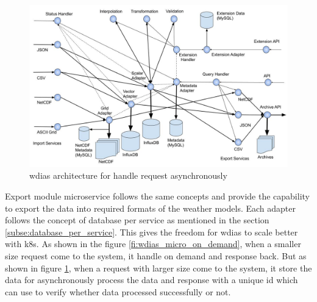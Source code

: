 \begin{figure}[htp]
    \centering
    \includegraphics[width=1\textwidth]{method/microservice/microservice_architecture-handle_on_async-v3.jpg}
    \caption{\acrshort{wdias} architecture for handle request asynchronously}
    \label{fi:wdias_micro_async}
\end{figure}
Export module microservice follows the same concepts and provide the capability to export the data into required formats of the weather models.
Each adapter follows the concept of database per service as mentioned in the section \ref{subse:database_per_service}. This gives the freedom for \acrshort{wdias} to scale better with \acrshort{k8s}.
As shown in the figure \ref{fi:wdias_micro_on_demand}, when a smaller size request come to the system, it handle on demand and response back. But as shown in figure \ref{fi:wdias_micro_async}, when a request with larger size come to the system, it store the data for asynchronously process the data and response with a unique id which can use to verify whether data processed successfully or not.

